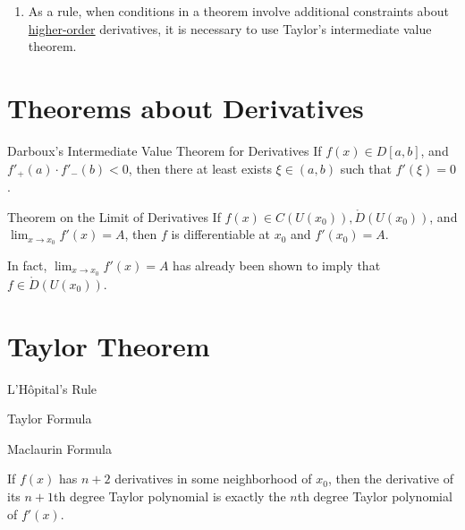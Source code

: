 \documentclass[11pt]{../../TexTemplate/elegantbook}
\begin{document}
\begin{note}
\begin{enumerate}
    \item As a rule, when conditions in a theorem involve additional constraints about \underline{higher-order} derivatives, 
        it is necessary to use Taylor's intermediate value theorem.
\end{enumerate}
\end{note}



\section{Theorems about Derivatives}

\begin{theorem}{Darboux's Intermediate Value Theorem for Derivatives}
    If \(f(x)\in D[a,b]\), and \(f'_{+}(a)\cdot f'_{-}(b)<0\),
    then there at least exists \(\xi\in (a,b)\) such that \(f'(\xi) = 0\).
\end{theorem}

\begin{theorem}{Theorem on the Limit of Derivatives}
    If \(f(x)\in C(U(x_{0})),\mathring{D}(U(x_{0}))\), and \(\lim_{x \to x_{0}} f'(x) = A\),
    then \(f\) is differentiable at \(x_{0}\) and \(f'(x_{0}) = A\).
\end{theorem}
\begin{remark}
    In fact, \(\lim_{x \to x_{0}} f'(x) = A\) has already been shown to imply that \(f\in \mathring{D}(U(x_{0}))\).
\end{remark}

\section{Taylor Theorem}
\begin{leftbarTitle}{L'Hôpital's Rule}\end{leftbarTitle}

\begin{leftbarTitle}{Taylor Formula}\end{leftbarTitle}


\begin{leftbarTitle}{Maclaurin Formula}\end{leftbarTitle}
\begin{lemma}
    If \(f(x)\) has \(n+2\) derivatives in some neighborhood of \(x_{0}\), 
    then the derivative of its \(n+1\)th degree Taylor polynomial 
    is exactly the \(n\)th degree Taylor polynomial of \(f'(x)\).
\end{lemma}
\end{document}
